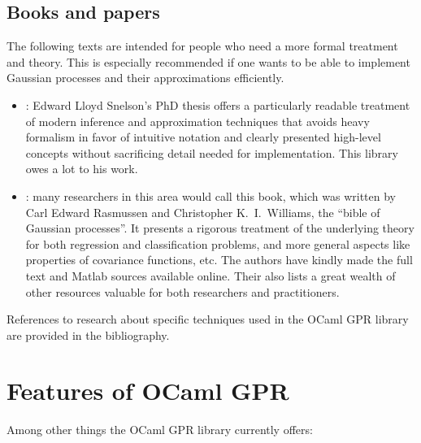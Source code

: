 \documentclass[10pt]{report}
\begin{document}
\subsection{Books and papers}

The following texts are intended for people who need a more formal treatment and
theory.  This is especially recommended if one wants to be able to implement
Gaussian processes and their approximations efficiently.

\begin{itemize}

\item
\emph{}: Edward Lloyd
Snelson's PhD thesis \cite{SnelsonThesis} offers a particularly readable
treatment of modern inference and approximation techniques that avoids heavy
formalism in favor of intuitive notation and clearly presented high-level
concepts without sacrificing detail needed for implementation.  This library
owes a lot to his work.

\item \emph{}: many researchers in this area would call this book,
which was written by Carl Edward Rasmussen and Christopher K.\ I.\  Williams,
the ``bible of Gaussian processes''.  It presents a rigorous treatment of the
underlying theory for both regression and classification problems, and more
general aspects like properties of covariance functions, etc.  The authors have
kindly made the full text and Matlab sources available online.  Their
 also lists
a great wealth of other resources valuable for both researchers and
practitioners.

\end{itemize}

References to research about specific techniques used in the OCaml GPR library
are provided in the bibliography.

\section{Features of OCaml GPR}

Among other things the OCaml GPR library currently offers:
\end{document}
